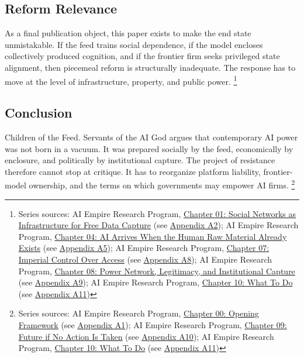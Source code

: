 \documentclass[
  american,
  11pt,
  letterpaper,
]{article}
\begin{document}
\subsection{Reform Relevance}\label{reform-relevance}

As a final publication object, this paper exists to make the end state
unmistakable. If the feed trains social dependence, if the model
encloses collectively produced cognition, and if the frontier firm seeks
privileged state alignment, then piecemeal reform is structurally
inadequate. The response has to move at the level of infrastructure,
property, and public power. \footnote{Series sources: AI Empire Research
  Program, \href{01_social-networks-data-capture_paper.html}{Chapter 01:
  Social Networks as Infrastructure for Free Data Capture} (see
  \hyperref[appendix-a2-chapter-01-social-networks-as-infrastructure-for-free-data-capture]{Appendix
  A2}); AI Empire Research Program,
  \href{04_data-models-weights_paper.html}{Chapter 04: AI Arrives When
  the Human Raw Material Already Exists} (see
  \hyperref[appendix-a5-chapter-04-ai-arrives-when-the-human-raw-material-already-exists]{Appendix
  A5}); AI Empire Research Program,
  \href{07_imperial-control-over-access_paper.html}{Chapter 07: Imperial
  Control Over Access} (see
  \hyperref[appendix-a8-chapter-07-imperial-control-over-access]{Appendix
  A8}); AI Empire Research Program,
  \href{08_legitimacy-and-institutional-capture_paper.html}{Chapter 08:
  Power Network, Legitimacy, and Institutional Capture} (see
  \hyperref[appendix-a9-chapter-08-power-network-legitimacy-and-institutional-capture]{Appendix
  A9}); AI Empire Research Program,
  \href{10_three-reform-program_paper.html}{Chapter 10: What To Do} (see
  \hyperref[appendix-a11-chapter-10-what-to-do]{Appendix A11})}

\subsection{Conclusion}\label{conclusion}

Children of the Feed. Servants of the AI God argues that contemporary AI
power was not born in a vacuum. It was prepared socially by the feed,
economically by enclosure, and politically by institutional capture. The
project of resistance therefore cannot stop at critique. It has to
reorganize platform liability, frontier-model ownership, and the terms
on which governments may empower AI firms. \footnote{Series sources: AI
  Empire Research Program,
  \href{00_opening-framework_paper.html}{Chapter 00: Opening Framework}
  (see \hyperref[appendix-a1-chapter-00-opening-framework]{Appendix
  A1}); AI Empire Research Program,
  \href{09_future-if-unchecked_paper.html}{Chapter 09: Future if No
  Action Is Taken} (see
  \hyperref[appendix-a10-chapter-09-future-if-no-action-is-taken]{Appendix
  A10}); AI Empire Research Program,
  \href{10_three-reform-program_paper.html}{Chapter 10: What To Do} (see
  \hyperref[appendix-a11-chapter-10-what-to-do]{Appendix A11})}
\end{document}
